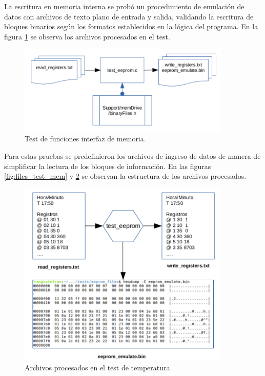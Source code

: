 
La escritura en memoria interna se probó un procedimiento de emulación de datos con archivos de texto plano de entrada y salida,  validando la escritura de bloques binarios según los formatos establecidos en la lógica del programa. En la figura \ref{fig:diag_test_mem} se observa los archivos procesados en el test.
\begin{figure}[h!]
	\centering
	\includegraphics[width=0.9\textwidth]{Figures/Cap_4/diag_test_memoria}
	\caption{Test de funciones interfaz de memoria.}
	\label{fig:diag_test_mem}
\end{figure}

Para estas pruebas se predefinieron los archivos de ingreso de datos de manera de simplificar la lectura de los bloques de información. En las figuras \ref{fig:files_test_mem} y \ref{fig:files_test_temp} se observan la estructura de los archivos procesados.

\begin{figure}[h!]
	\centering
	\includegraphics[width=0.9\textwidth]{Figures/Cap_4/files_test_temperatura}
	\caption{ Archivos procesados en el test de temperatura.}
	\label{fig:files_test_temp}
\end{figure}

